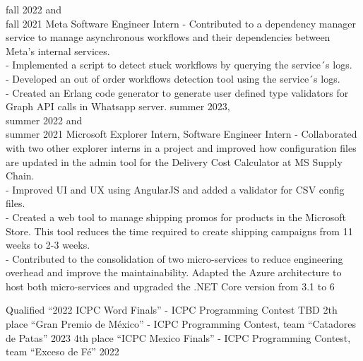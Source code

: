 \documentclass[9pt]{developercv} %
\begin{document}
\begin{entrylist}
    \entry
        {fall 2022 and\\fall 2021}
        {Meta}
        {Software Engineer Intern}
        {- Contributed to a dependency manager service to manage asynchronous workflows and their dependencies between Meta's internal services.\\
        - Implemented a script to detect stuck workflows by querying the service´s logs.\\
		- Developed an out of order workflows detection tool using the service´s logs.\\
        - Created an Erlang code generator to generate user defined type validators for Graph API calls in Whatsapp server.}
	\entry
		{summer 2023,\\summer 2022 and\\summer 2021}
		{Microsoft}
		{Explorer Intern, Software Engineer Intern}
		{- Collaborated with two other explorer interns in a project and improved how configuration files are updated in the admin tool for the Delivery Cost Calculator at MS Supply Chain.\\
		- Improved UI and UX using AngularJS and added a validator for CSV config files.\\
        - Created a web tool to manage shipping promos for products in the Microsoft Store. This tool reduces the time required to create shipping campaigns from 11 weeks to 2-3 weeks.\\
		- Contributed to the consolidation of two micro-services to reduce engineering overhead and improve the maintainability. Adapted the Azure architecture to host both micro-services and upgraded the .NET Core version from 3.1 to 6}
\end{entrylist}



\begin{entrylist}
	\entry
		{Qualified}
		{``2022 ICPC Word Finals'' - ICPC Programming Contest}
		{TBD}
		{}
	\entry
		{2th place}
		{``Gran Premio de México'' - ICPC Programming Contest, team ``Catadores de Patas''}
		{2023}
		{}
	\entry
		{4th place}
		{``ICPC Mexico Finals'' - ICPC Programming Contest, team ``Exceso de Fé''}
		{2022}
		{}
\end{entrylist}
\end{document}

